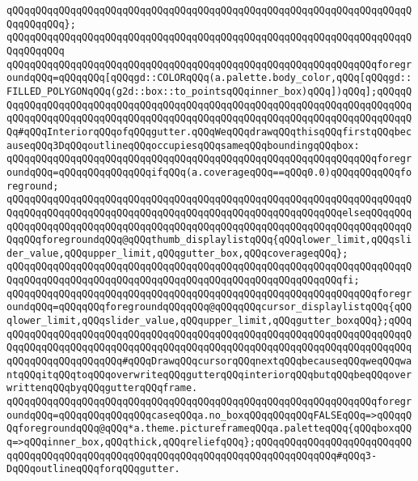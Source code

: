 \verb|qQQqqQQqqQQqqQQqqQQqqQQqqQQqqQQqqQQqqQQqqQQqqQQqqQQqqQQqqQQqqQQqqQQqqQQqqQQqqQQq};|\newline
\verb|qQQqqQQqqQQqqQQqqQQqqQQqqQQqqQQqqQQqqQQqqQQqqQQqqQQqqQQqqQQqqQQqqQQqqQQqqQQqqQQq|\newline
\newline
\verb|qQQqqQQqqQQqqQQqqQQqqQQqqQQqqQQqqQQqqQQqqQQqqQQqqQQqqQQqqQQqqQQqforegroundqQQq=qQQqqQQq[qQQqgd::COLORqQQq(a.palette.body_color,qQQq[qQQqgd::FILLED_POLYGONqQQq(g2d::box::to_pointsqQQqinner_box)qQQq])qQQq];qQQqqQQqqQQqqQQqqQQqqQQqqQQqqQQqqQQqqQQqqQQqqQQqqQQqqQQqqQQqqQQqqQQqqQQqqQQqqQQqqQQqqQQqqQQqqQQqqQQqqQQqqQQqqQQqqQQqqQQqqQQqqQQqqQQqqQQqqQQqqQQqqQQq#qQQqInteriorqQQqofqQQqgutter.qQQqWeqQQqdrawqQQqthisqQQqfirstqQQqbecauseqQQq3DqQQqoutlineqQQqoccupiesqQQqsameqQQqboundingqQQqbox:|\newline
\newline
\verb|qQQqqQQqqQQqqQQqqQQqqQQqqQQqqQQqqQQqqQQqqQQqqQQqqQQqqQQqqQQqqQQqforegroundqQQq=qQQqqQQqqQQqqQQqifqQQq(a.coverageqQQq==qQQq0.0)qQQqqQQqqQQqforeground;|\newline
\verb|qQQqqQQqqQQqqQQqqQQqqQQqqQQqqQQqqQQqqQQqqQQqqQQqqQQqqQQqqQQqqQQqqQQqqQQqqQQqqQQqqQQqqQQqqQQqqQQqqQQqqQQqqQQqqQQqqQQqqQQqqQQqqQQqelseqQQqqQQqqQQqqQQqqQQqqQQqqQQqqQQqqQQqqQQqqQQqqQQqqQQqqQQqqQQqqQQqqQQqqQQqqQQqqQQqqQQqforegroundqQQq@qQQqthumb_displaylistqQQq{qQQqlower_limit,qQQqslider_value,qQQqupper_limit,qQQqgutter_box,qQQqcoverageqQQq};|\newline
\verb|qQQqqQQqqQQqqQQqqQQqqQQqqQQqqQQqqQQqqQQqqQQqqQQqqQQqqQQqqQQqqQQqqQQqqQQqqQQqqQQqqQQqqQQqqQQqqQQqqQQqqQQqqQQqqQQqqQQqqQQqqQQqqQQqfi;|\newline
\newline
\verb|qQQqqQQqqQQqqQQqqQQqqQQqqQQqqQQqqQQqqQQqqQQqqQQqqQQqqQQqqQQqqQQqforegroundqQQq=qQQqqQQqforegroundqQQqqQQq@qQQqqQQqcursor_displaylistqQQq{qQQqlower_limit,qQQqslider_value,qQQqupper_limit,qQQqgutter_boxqQQq};qQQqqQQqqQQqqQQqqQQqqQQqqQQqqQQqqQQqqQQqqQQqqQQqqQQqqQQqqQQqqQQqqQQqqQQqqQQqqQQqqQQqqQQqqQQqqQQqqQQqqQQqqQQqqQQqqQQqqQQqqQQqqQQqqQQqqQQqqQQqqQQqqQQqqQQqqQQqqQQqqQQq#qQQqDrawqQQqcursorqQQqnextqQQqbecauseqQQqweqQQqwantqQQqitqQQqtoqQQqoverwriteqQQqgutterqQQqinteriorqQQqbutqQQqbeqQQqoverwrittenqQQqbyqQQqgutterqQQqframe.|\newline
\newline
\verb|qQQqqQQqqQQqqQQqqQQqqQQqqQQqqQQqqQQqqQQqqQQqqQQqqQQqqQQqqQQqqQQqforegroundqQQq=qQQqqQQqqQQqqQQqcaseqQQqa.no_boxqQQqqQQqqQQqFALSEqQQq=>qQQqqQQqforegroundqQQq@qQQq*a.theme.pictureframeqQQqa.paletteqQQq{qQQqboxqQQq=>qQQqinner_box,qQQqthick,qQQqreliefqQQq};qQQqqQQqqQQqqQQqqQQqqQQqqQQqqQQqqQQqqQQqqQQqqQQqqQQqqQQqqQQqqQQqqQQqqQQqqQQqqQQqqQQq#qQQq3-DqQQqoutlineqQQqforqQQqgutter.|\newline
